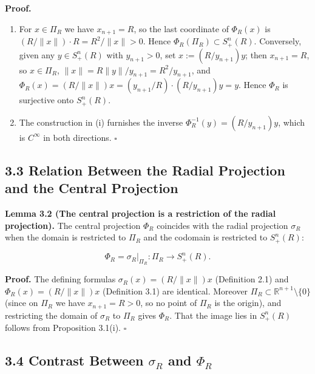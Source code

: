 \documentclass[
]{ltjsarticle}
\begin{document}
\textbf{Proof.}

\begin{enumerate}
\def\labelenumi{(\roman{enumi})}
\item
  For \(x \in \Pi_R\) we have \(x_{n+1} = R\), so the last coordinate of
  \(\Phi_R(x)\) is \((R/\|x\|) \cdot R = R^2/\|x\| > 0\). Hence
  \(\Phi_R(\Pi_R) \subset S^n_+(R)\). Conversely, given any
  \(y \in S^n_+(R)\) with \(y_{n+1} > 0\), set \(x := (R/y_{n+1}) y\);
  then \(x_{n+1} = R\), so \(x \in \Pi_R\),
  \(\|x\| = R\|y\|/y_{n+1} = R^2/y_{n+1}\), and
  \(\Phi_R(x) = (R/\|x\|) x = (y_{n+1}/R) \cdot (R/y_{n+1}) y = y\).
  Hence \(\Phi_R\) is surjective onto \(S^n_+(R)\).
\item
  The construction in (i) furnishes the inverse
  \(\Phi_R^{-1}(y) = (R/y_{n+1}) y\), which is \(C^\infty\) in both
  directions. \(\square\)
\end{enumerate}

\subsection{3.3 Relation Between the Radial Projection and the Central
Projection}\label{relation-between-the-radial-projection-and-the-central-projection}

\textbf{Lemma 3.2 (The central projection is a restriction of the radial
projection).} The central projection \(\Phi_R\) coincides with the
radial projection \(\sigma_R\) when the domain is restricted to
\(\Pi_R\) and the codomain is restricted to \(S^n_+(R)\):

\[\Phi_R = \sigma_R \big|_{\Pi_R}: \Pi_R \to S^n_+(R). \tag{3.3}\]

\textbf{Proof.} The defining formulas \(\sigma_R(x) = (R/\|x\|) x\)
(Definition 2.1) and \(\Phi_R(x) = (R/\|x\|) x\) (Definition 3.1) are
identical. Moreover \(\Pi_R \subset \mathbb{R}^{n+1} \setminus \{0\}\)
(since on \(\Pi_R\) we have \(x_{n+1} = R > 0\), so no point of
\(\Pi_R\) is the origin), and restricting the domain of \(\sigma_R\) to
\(\Pi_R\) gives \(\Phi_R\). That the image lies in \(S^n_+(R)\) follows
from Proposition 3.1(i). \(\square\)

\subsection{\texorpdfstring{3.4 Contrast Between \(\sigma_R\) and
\(\Phi_R\)}{3.4 Contrast Between \textbackslash sigma\_R and \textbackslash Phi\_R}}\label{contrast-between-sigma_r-and-phi_r}
\end{document}

